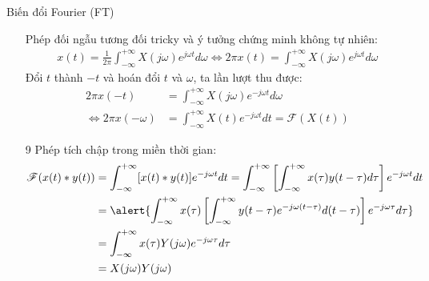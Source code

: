\documentclass[8pt]{beamer}
\begin{document}
\begin{frame}{Biến đổi Fourier (FT)}
\begin{enumerate}
	\item[] Phép đối ngẫu tương đối tricky và ý tưởng chứng minh không tự nhiên:
		\begin{equation*}
\begin{split}
	x(t)=\frac{1}{2\pi}\int_{-\infty}^{+\infty}X(j\omega)e^{j\omega t}d\omega\Leftrightarrow 2\pi x(t)=\int_{-\infty}^{+\infty}X(j\omega)e^{j\omega t}d\omega
\end{split}
		\end{equation*}
Đổi $t$ thành $-t$ và hoán đổi $t$ và $\omega$, ta lần lượt thu được:
\begin{equation*}
\begin{split}
	2\pi x(-t)&=\int_{-\infty}^{+\infty}X(j\omega)e^{-j\omega t}d\omega\\
	\Leftrightarrow 2\pi x(-\omega)&=\int_{-\infty}^{+\infty}X(t)e^{-j\omega t}dt=\mathscr{F}(X(t))
\end{split}
\end{equation*}
\item[9] Phép tích chập trong miền thời gian:
\begin{equation*}
\begin{split}
	\mathscr{F}(x(t)*y(t))&=\int_{-\infty}^{+\infty}[x(t)*y(t)]e^{-j\omega t}dt=\int_{-\infty}^{+\infty}\left[\int_{-\infty}^{+\infty}x(\tau)y(t-\tau)d\tau\right]e^{-j\omega t}dt\\
			      &=\alert{\int_{-\infty}^{+\infty}x(\tau)\left[\int_{-\infty}^{+\infty}y(t-\tau)e^{-j\omega (t-\tau)} d(t-\tau)\right]e^{-j\omega \tau}d\tau}\\
			      &=\int_{-\infty}^{+\infty}x(\tau)Y(j\omega)e^{-j\omega \tau}d\tau \\
			      &=X(j\omega)Y(j\omega)
\end{split}
\end{equation*}
\end{enumerate}
\end{frame}
\end{document}
